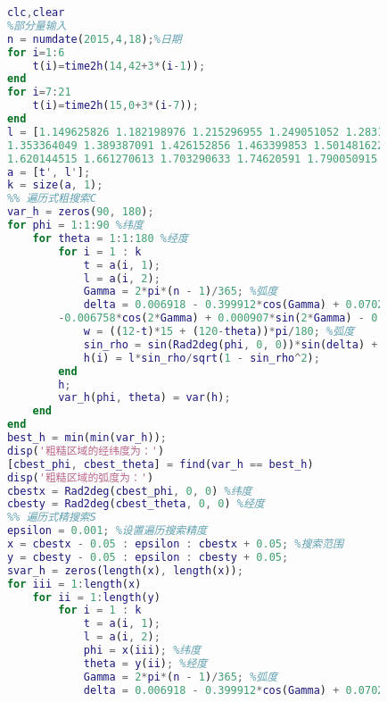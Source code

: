             \begin{lstlisting}[language = Matlab]
            %%%%%%%%%%%%%%%%%%%%%%%%%%%%%模型一：最小方差模型%%%%%%%%%%%%%%%%%%%%%%%%%%%%%
            clc,clear
            %部分量输入
            n = numdate(2015,4,18);%日期
            for i=1:6
                t(i)=time2h(14,42+3*(i-1));
            end
            for i=7:21
                t(i)=time2h(15,0+3*(i-7));
            end
            l = [1.149625826 1.182198976 1.215296955 1.249051052 1.28319534 1.317993149 ...
            1.353364049 1.389387091 1.426152856 1.463399853 1.501481622 1.540231817 1.579853316...
            1.620144515 1.661270613 1.703290633 1.74620591 1.790050915 1.835014272 1.880875001 1.927918447 ];
            a = [t', l'];
            k = size(a, 1);
            %% 遍历式粗搜索C
            var_h = zeros(90, 180);
            for phi = 1:1:90 %纬度
                for theta = 1:1:180 %经度
                    for i = 1 : k
                        t = a(i, 1);
                        l = a(i, 2);
                        Gamma = 2*pi*(n - 1)/365; %弧度
                        delta = 0.006918 - 0.399912*cos(Gamma) + 0.070257*sin(Gamma)...
                    -0.006758*cos(2*Gamma) + 0.000907*sin(2*Gamma) - 0.002697*cos(3*Gamma) + 0.00148*sin(3*Gamma);%弧度
                        w = ((12-t)*15 + (120-theta))*pi/180; %弧度
                        sin_rho = sin(Rad2deg(phi, 0, 0))*sin(delta) + cos(Rad2deg(phi, 0, 0))*cos(w)*cos(delta);
                        h(i) = l*sin_rho/sqrt(1 - sin_rho^2);
                    end
                    h;
                    var_h(phi, theta) = var(h);
                end
            end
            best_h = min(min(var_h));
            disp('粗糙区域的经纬度为：')
            [cbest_phi, cbest_theta] = find(var_h == best_h)
            disp('粗糙区域的弧度为：')
            cbestx = Rad2deg(cbest_phi, 0, 0) %纬度
            cbesty = Rad2deg(cbest_theta, 0, 0) %经度
            %% 遍历式精搜索S
            epsilon = 0.001; %设置遍历搜索精度
            x = cbestx - 0.05 : epsilon : cbestx + 0.05; %搜索范围
            y = cbesty - 0.05 : epsilon : cbesty + 0.05;
            svar_h = zeros(length(x), length(x));
            for iii = 1:length(x)
                for ii = 1:length(y)
                    for i = 1 : k
                        t = a(i, 1);
                        l = a(i, 2);
                        phi = x(iii); %纬度
                        theta = y(ii); %经度
                        Gamma = 2*pi*(n - 1)/365; %弧度
                        delta = 0.006918 - 0.399912*cos(Gamma) + 0.070257*sin(Gamma)...

\end{lstlisting}
